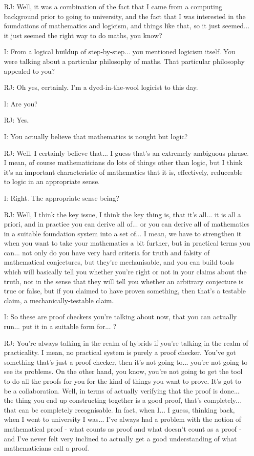 \documentclass[10pt,titlepage]{book}
\begin{document}
RJ: Well, it was a combination of the fact that I came from a computing background prior to going to university, and the fact that I was interested in the foundations of mathematics and logicism, and things like that, so it just seemed... it just seemed the right way to do maths, you know?

I: From a logical buildup of step-by-step... you mentioned logicism itself. You were talking about a particular philosophy of maths. That particular philosophy appealed to you?

RJ: Oh yes, certainly. I'm a dyed-in-the-wool logicist to this day.

I: Are you?

RJ: Yes.

I: You actually believe that mathematics is nought but logic?

RJ: Well, I certainly believe that... I guess that's an extremely ambiguous phrase. I mean, of course mathematicians do lots of things other than logic, but I think it's an important characteristic of mathematics that it is, effectively, reduceable to logic in an appropriate sense.

I: Right. The appropriate sense being?

RJ: Well, I think the key issue, I think the key thing is, that it's all... it is all a priori, and in practice you can derive all of... or you can derive all of mathematics in a suitable foundation system into a set of... I mean, we have to strengthen it when you want to take your mathematics a bit further, but in practical terms you can... not only do you have very hard criteria for truth and falsity of mathematical conjectures, but they're mechanisable, and you can build tools which will basically tell you whether you're right or not in your claims about the truth, not in the sense that they will tell you whether an arbitrary conjecture is true or false, but if you claimed to have proven something, then that's a testable claim, a mechanically-testable claim.

I: So these are proof checkers you're talking about now, that you can actually run... put it in a suitable form for... ?

RJ: You're always talking in the realm of hybrids if you're talking in the realm of practicality. I mean, no practical system is purely a proof checker. You've got something that's just a proof checker, then it's not going to... you're not going to see its problems. On the other hand, you know, you're not going to get the tool to do all the proofs for you for the kind of things you want to prove. It's got to be a collaboration. Well, in terms of actually verifying that the proof is done... the thing you end up constructing together is a good proof, that's completely... that can be completely recognisable. In fact, when I... I guess, thinking back, when I went to university I was... I've always had a problem with the notion of mathematical proof - what counts as proof and what doesn't count as a proof - and I've never felt very inclined to actually get a good understanding of what mathematicians call a proof.
\end{document}
